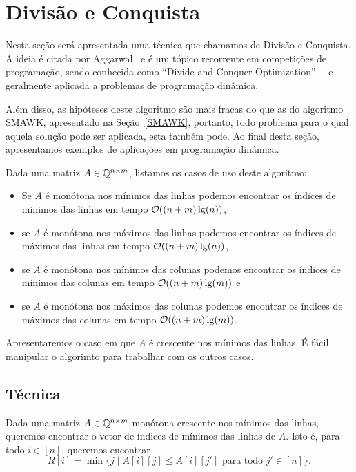 \section{Divisão e Conquista}
\label{DivisaoEConquista}


Nesta seção será apresentada uma técnica que chamamos de Divisão e Conquista. A ideia é citada por Aggarwal~\cite{Aggarwal:1987} e é um tópico recorrente em competições de programação, sendo conhecida como ``Divide and Conquer Optimization''~\cite{Quora:DivConq}~\cite{CF:Optm} e geralmente aplicada a problemas de programação dinâmica. 

Além disso, as hipóteses deste algoritmo são mais fracas do que as do algoritmo SMAWK, apresentado na Seção~\ref{SMAWK}, portanto, todo problema para o qual aquela solução pode ser aplicada, esta também pode. Ao final desta seção, apresentamos exemplos de aplicações em programação dinâmica.  

Dada uma matriz $A \in \mathbb{Q}^{n \times m}$, listamos os casos de uso deste algoritmo:
\begin{itemize}
    \item Se $A$ é monótona nos mínimos das linhas podemos encontrar os índices de mínimos das linhas em tempo $\mathcal{O}((n+m)\lg(n))$, 
    \item se $A$ é monótona nos máximos das linhas podemos encontrar os índices de máximos das linhas em tempo $\mathcal{O}((n+m)\lg(n))$, 
    \item se $A$ é monótona nos mínimos das colunas podemos encontrar os índices de mínimos das colunas em tempo $\mathcal{O}((n+m)\lg(m))$ e 
    \item se $A$ é monótona nos máximos das colunas podemos encontrar os índices de máximos das colunas em tempo $\mathcal{O}((n+m)\lg(m))$.
\end{itemize}

Apresentaremos o caso em que $A$ é crescente nos mínimos das linhas. É fácil manipular o algorimto para trabalhar com os outros casos.


\subsection{Técnica}
Dada uma matriz $A \in \mathbb{Q}^{n \times m}$ monótona crescente nos mínimos das linhas, queremos encontrar o vetor de índices de mínimos das linhas de $A$. Isto é, para todo $i \in [n]$, queremos encontrar
$$ R[i] = \min\{j \mid A[i][j] \leq A[i][j'] \text{ para todo } j' \in [n]\} \text{.}$$  

